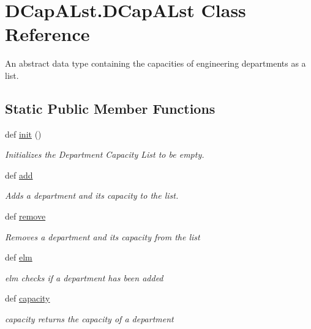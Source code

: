 \hypertarget{class_d_cap_a_lst_1_1_d_cap_a_lst}{}\section{D\+Cap\+A\+Lst.\+D\+Cap\+A\+Lst Class Reference}
\label{class_d_cap_a_lst_1_1_d_cap_a_lst}


An abstract data type containing the capacities of engineering departments as a list.  


\subsection*{Static Public Member Functions}
\begin{DoxyCompactItemize}
\item 
\mbox{\label{class_d_cap_a_lst_1_1_d_cap_a_lst_aaed5d536e93c43a53eca6c75faa64d2e}} 
def \hyperlink{class_d_cap_a_lst_1_1_d_cap_a_lst_aaed5d536e93c43a53eca6c75faa64d2e}{init} ()
\begin{DoxyCompactList}\small\item\em Initializes the Department Capacity List to be empty. \end{DoxyCompactList}\item 
def \hyperlink{class_d_cap_a_lst_1_1_d_cap_a_lst_a7ae2713aa4cf52277bf95d345033aef1}{add}
\begin{DoxyCompactList}\small\item\em Adds a department and its capacity to the list. \end{DoxyCompactList}\item 
def \hyperlink{class_d_cap_a_lst_1_1_d_cap_a_lst_a8c708603e65c31aaf03449c3e449a900}{remove}
\begin{DoxyCompactList}\small\item\em Removes a department and its capacity from the list \end{DoxyCompactList}\item 
def \hyperlink{class_d_cap_a_lst_1_1_d_cap_a_lst_a1544d1dd5a4da06d12379ff2b752b5fc}{elm}
\begin{DoxyCompactList}\small\item\em elm checks if a department has been added \end{DoxyCompactList}\item 
def \hyperlink{class_d_cap_a_lst_1_1_d_cap_a_lst_a60327f8162913725028ca07da0d14e69}{capacity}
\begin{DoxyCompactList}\small\item\em capacity returns the capacity of a department \end{DoxyCompactList}\end{DoxyCompactItemize}


